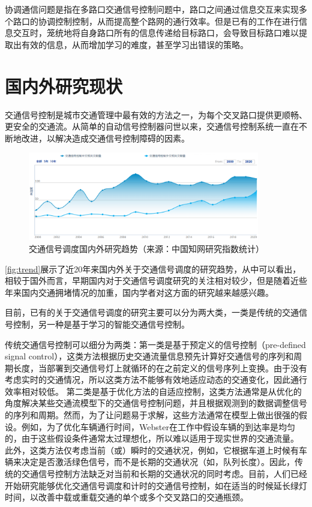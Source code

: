 协调通信问题是指在多路口交通信号控制问题中，路口之间通过信息交互来实现多个路口的协调控制控制，从而提高整个路网的通行效率。但是已有的工作在进行信息交互时，笼统地将自身路口所有的信息传递给目标路口，会导致目标路口难以提取出有效的信息，从而增加学习的难度，甚至学习出错误的策略。


\section{国内外研究现状}
交通信号控制是城市交通管理中最有效的方法之一，为每个交叉路口提供更顺畅、更安全的交通流。从简单的自动信号控制器问世以来，交通信号控制系统一直在不断地改进，以解决造成交通信号控制障碍的因素。
\begin{figure}[htb]
    \includegraphics[width=0.9\textwidth]{fig/trend.png}
    \caption{交通信号调度国内外研究趋势（来源：中国知网研究指数统计）}
    \label{fig:trend}
\end{figure}
\autoref{fig:trend}展示了近20年来国内外关于交通信号调度的研究趋势，从中可以看出，相较于国外而言，早期国内对于交通信号调度研究的关注相对较少，但是随着近些年来国内交通拥堵情况的加重，国内学者对这方面的研究越来越感兴趣。

目前，已有的关于交通信号调度的研究主要可以分为两大类，一类是传统的交通信号控制，另一种是基于学习的智能交通信号控制。

传统交通信号控制可以细分为两类：第一类是基于预定义的信号控制（pre-defined signal control）\cite{miller1963settings}，这类方法根据历史交通流量信息预先计算好交通信号的序列和周期长度，当部署到交通信号灯上就循环的在之前定义的信号序列上变换。由于没有考虑实时的交通情况，所以这类方法不能够有效地适应动态的交通变化，因此通行效率相对较低。
第二类是基于优化方法的自适应控制，这类方法通常是从优化的角度解决某些交通流模型下的交通信号控制问题，并且根据观测到的数据调整信号的序列和周期。然而，为了让问题易于求解，这些方法通常在模型上做出很强的假设\cite{baang1976optimal,silcock1997designing,haddad2010optimal}。例如，为了优化车辆通行时间，Webster在工作中假设车辆的到达率是均匀的，由于这些假设条件通常太过理想化，所以难以适用于现实世界的交通流量。
此外，这类方法仅考虑当前（或）瞬时的交通状况，例如，它根据车道上时候有车辆来决定是否激活绿色信号，而不是长期的交通状况（如，队列长度）。因此，传统的交通信号控制方法缺乏对当前和长期的交通状况的同时考虑。目前，人们已经开始研究能够优化交通信号调度和计时的交通信号控制，如在适当的时候延长绿灯时间，以改善中载或重载交通的单个或多个交叉路口的交通瓶颈。


